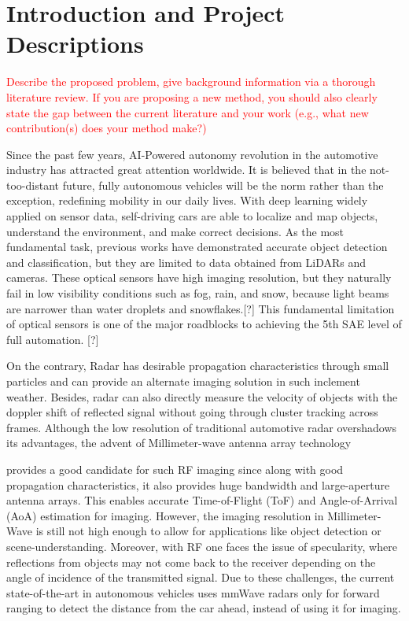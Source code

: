 \section{Introduction and Project Descriptions}
\textcolor{red}{
Describe the proposed problem, give background information via a thorough literature review. If you are proposing a new method, you should also clearly state the gap between the current literature and your work (e.g., what new contribution(s) does your method make?)}

Since the past few years, AI-Powered autonomy revolution in the automotive industry has attracted great attention worldwide. It is believed that in the not-too-distant future, fully
autonomous vehicles will be the norm rather than the exception, redefining mobility in our daily lives. With deep learning widely applied on sensor data, self-driving cars are able to localize and map objects, understand the environment, and make correct decisions. As the most fundamental task, previous works have demonstrated accurate object detection and classification, but they are limited to data obtained from LiDARs and cameras. These optical sensors have high imaging resolution, but they naturally fail in low visibility conditions such as fog, rain, and snow, because light beams are narrower than water droplets and snowflakes.[?] This fundamental limitation of optical sensors is one of the major roadblocks to achieving the 5th SAE level of full automation. [?]  

On the contrary, Radar has desirable propagation characteristics through small particles and can provide an alternate imaging solution in such inclement weather. Besides, radar can also directly measure the velocity of objects with the doppler shift of reflected signal without going through cluster tracking across frames. Although the low resolution of traditional automotive radar overshadows its advantages, the advent of Millimeter-wave antenna array technology 

provides a good candidate for such RF imaging since along with good propagation characteristics, it also provides huge bandwidth and large-aperture antenna arrays. This enables accurate Time-of-Flight (ToF) and Angle-of-Arrival (AoA) estimation for imaging. However, the imaging resolution in Millimeter-Wave is still not high enough to allow for applications like object detection or scene-understanding. Moreover, with RF one faces the issue of specularity, where reflections from objects may not come back to the receiver depending on the angle of incidence of the transmitted signal. Due to these challenges, the current state-of-the-art in autonomous vehicles uses mmWave radars only for forward ranging to detect the distance from the car ahead, instead of using it for imaging. 

